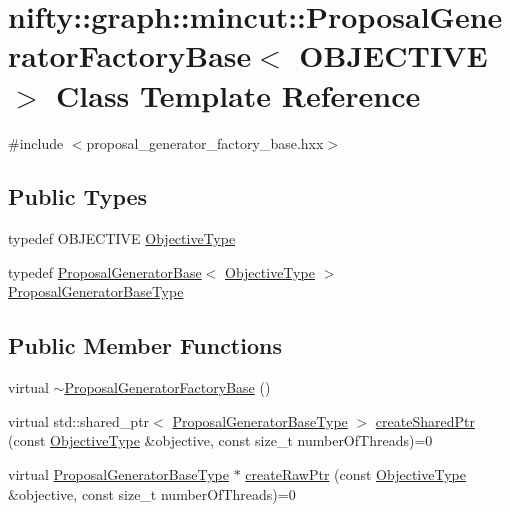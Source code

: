 \hypertarget{classnifty_1_1graph_1_1mincut_1_1ProposalGeneratorFactoryBase}{}\section{nifty\+:\+:graph\+:\+:mincut\+:\+:Proposal\+Generator\+Factory\+Base$<$ O\+B\+J\+E\+C\+T\+I\+V\+E $>$ Class Template Reference}
\label{classnifty_1_1graph_1_1mincut_1_1ProposalGeneratorFactoryBase}


{\ttfamily \#include $<$proposal\+\_\+generator\+\_\+factory\+\_\+base.\+hxx$>$}

\subsection*{Public Types}
\begin{DoxyCompactItemize}
\item 
typedef O\+B\+J\+E\+C\+T\+I\+V\+E \hyperlink{classnifty_1_1graph_1_1mincut_1_1ProposalGeneratorFactoryBase_a24f24df2bb0f1d7f10c81cd5f95358f8}{Objective\+Type}
\item 
typedef \hyperlink{classnifty_1_1graph_1_1mincut_1_1ProposalGeneratorBase}{Proposal\+Generator\+Base}$<$ \hyperlink{classnifty_1_1graph_1_1mincut_1_1ProposalGeneratorFactoryBase_a24f24df2bb0f1d7f10c81cd5f95358f8}{Objective\+Type} $>$ \hyperlink{classnifty_1_1graph_1_1mincut_1_1ProposalGeneratorFactoryBase_a75eebf60e173596ea93100a2d77d87e0}{Proposal\+Generator\+Base\+Type}
\end{DoxyCompactItemize}
\subsection*{Public Member Functions}
\begin{DoxyCompactItemize}
\item 
virtual \hyperlink{classnifty_1_1graph_1_1mincut_1_1ProposalGeneratorFactoryBase_ae2710810b0b9fd3ce28b665918579493}{$\sim$\+Proposal\+Generator\+Factory\+Base} ()
\item 
virtual std\+::shared\+\_\+ptr$<$ \hyperlink{classnifty_1_1graph_1_1mincut_1_1ProposalGeneratorFactoryBase_a75eebf60e173596ea93100a2d77d87e0}{Proposal\+Generator\+Base\+Type} $>$ \hyperlink{classnifty_1_1graph_1_1mincut_1_1ProposalGeneratorFactoryBase_aefc9857d66ea960365f2e8dc7e067f00}{create\+Shared\+Ptr} (const \hyperlink{classnifty_1_1graph_1_1mincut_1_1ProposalGeneratorFactoryBase_a24f24df2bb0f1d7f10c81cd5f95358f8}{Objective\+Type} \&objective, const size\+\_\+t number\+Of\+Threads)=0
\item 
virtual \hyperlink{classnifty_1_1graph_1_1mincut_1_1ProposalGeneratorFactoryBase_a75eebf60e173596ea93100a2d77d87e0}{Proposal\+Generator\+Base\+Type} $\ast$ \hyperlink{classnifty_1_1graph_1_1mincut_1_1ProposalGeneratorFactoryBase_a731d22a7fc8e0dbfd3b54d44231256af}{create\+Raw\+Ptr} (const \hyperlink{classnifty_1_1graph_1_1mincut_1_1ProposalGeneratorFactoryBase_a24f24df2bb0f1d7f10c81cd5f95358f8}{Objective\+Type} \&objective, const size\+\_\+t number\+Of\+Threads)=0
\end{DoxyCompactItemize}


